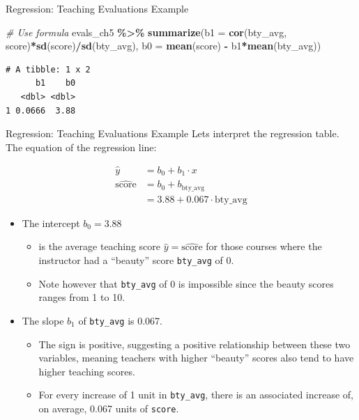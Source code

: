 \documentclass[
  ignorenonframetext,
]{beamer}
\newenvironment{Shaded}{\begin{snugshade}}{\end{snugshade}}
\newcommand{\AttributeTok}[1]{\textcolor[rgb]{0.13,0.29,0.53}{#1}}
\newcommand{\CommentTok}[1]{\textcolor[rgb]{0.56,0.35,0.01}{\textit{#1}}}
\newcommand{\FunctionTok}[1]{\textcolor[rgb]{0.13,0.29,0.53}{\textbf{#1}}}
\newcommand{\NormalTok}[1]{#1}
\newcommand{\SpecialCharTok}[1]{\textcolor[rgb]{0.81,0.36,0.00}{\textbf{#1}}}
\providecommand{\tightlist}{%
  \setlength{\itemsep}{0pt}\setlength{\parskip}{0pt}}
\begin{document}
\begin{frame}[fragile]{Regression: Teaching Evaluations Example}
\protect\hypertarget{regression-teaching-evaluations-example-4}{}
\small

\begin{Shaded}
\begin{Highlighting}[]
\CommentTok{\# Use formula}
\NormalTok{evals\_ch5 }\SpecialCharTok{\%\textgreater{}\%} 
  \FunctionTok{summarize}\NormalTok{(}\AttributeTok{b1 =} \FunctionTok{cor}\NormalTok{(bty\_avg, score)}\SpecialCharTok{*}\FunctionTok{sd}\NormalTok{(score)}\SpecialCharTok{/}\FunctionTok{sd}\NormalTok{(bty\_avg),}
            \AttributeTok{b0 =} \FunctionTok{mean}\NormalTok{(score) }\SpecialCharTok{{-}}\NormalTok{ b1}\SpecialCharTok{*}\FunctionTok{mean}\NormalTok{(bty\_avg))}
\end{Highlighting}
\end{Shaded}

\begin{verbatim}
# A tibble: 1 x 2
      b1    b0
   <dbl> <dbl>
1 0.0666  3.88
\end{verbatim}
\end{frame}

\begin{frame}[fragile]{Regression: Teaching Evaluations Example}
\protect\hypertarget{regression-teaching-evaluations-example-5}{}
Lets interpret the regression table. The equation of the regression
line:

\[
\begin{aligned}
\hat{y} &= b_0 +b_1\cdot x \\
\widehat{\text{score}} &= b_0 + b_{\text{bty\_avg}}\\
&= 3.88 + 0.067\cdot\text{bty\_avg}
\end{aligned}
\]

\begin{itemize}
\item
  The intercept \(b_0 = 3.88\)

  \begin{itemize}
  \tightlist
  \item
    is the average teaching score \(\hat{y}=\widehat{\text{score}}\) for
    those courses where the instructor had a ``beauty'' score
    \texttt{bty\_avg} of 0.
  \item
    Note however that \texttt{bty\_avg} of 0 is impossible since the
    beauty scores ranges from 1 to 10.
  \end{itemize}
\item
  The slope \(b_1\) of \texttt{bty\_avg} is 0.067.

  \begin{itemize}
  \tightlist
  \item
    The sign is positive, suggesting a positive relationship between
    these two variables, meaning teachers with higher ``beauty'' scores
    also tend to have higher teaching scores.
  \item
    For every increase of 1 unit in \texttt{bty\_avg}, there is an
    associated increase of, on average, 0.067 units of \texttt{score}.
  \end{itemize}
\end{itemize}
\end{frame}
\end{document}
